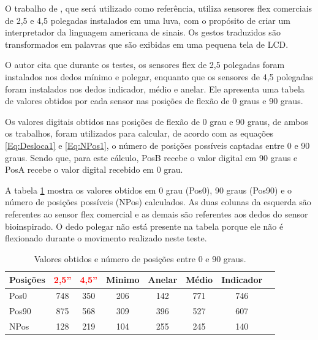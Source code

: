 \documentclass[
	12pt,				%
	openright,			%
	oneside,			%
	a4paper,			%
	english,			%
	brazil				%
	]{abntex2}
\begin{document}
	
		O trabalho de \cite{anbarasi2013deafmute}, que será utilizado como referência, utiliza sensores flex comerciais de 2,5 e 4,5 polegadas instalados em uma luva, com o propósito de criar um interpretador da linguagem americana de sinais. Os gestos traduzidos são transformados em palavras que são exibidas em uma pequena tela de LCD.

		O autor cita que durante os testes, os sensores flex de 2,5 polegadas foram instalados nos dedos mínimo e polegar, enquanto que os sensores de 4,5 polegadas foram instalados nos dedos indicador, médio e anelar. Ele apresenta uma tabela de valores obtidos por cada sensor nas posições de flexão de 0 graus e 90 graus.

		
		Os valores digitais obtidos nas posições de flexão de 0 grau e 90 graus, de ambos os trabalhos, foram utilizados para calcular, de acordo com as equações \ref{Eq:Desloca1} e \ref{Eq:NPos1}, o número de posições possíveis captadas entre 0 e 90 graus. Sendo que, para este cálculo, PosB recebe o valor digital em 90 graus e PosA recebe o valor digital recebido em 0 grau.

		A tabela \ref{Tab:NPos0-90} mostra os valores obtidos em 0 grau (Pos0), 90 graus (Pos90) e o número de posições possíveis (NPos) calculados. As duas colunas da esquerda são referentes ao sensor flex comercial e as demais são referentes aos dedos do sensor bioinspirado. O dedo polegar não está presente na tabela porque ele não é flexionado durante o movimento realizado neste teste.
		
		\begin{table}[H]
  	\centering
		\caption{Valores obtidos e número de posições entre 0 e 90 graus.}
    \begin{tabular}{l|ccccccc}
      \midrule
			Posições&\textcolor{red}{2,5''}	&\textcolor{red}{4,5''}	& Minimo	& Anelar	& Médio	&	Indicador	\\
      \midrule
			Pos0 		& 748 									& 350 									& 206 		&	142			&	771		&	746				\\
			Pos90 	& 875 									& 568 									& 309 		&	396			&	527		&	607				\\
			NPos 		& 128 									& 219 									& 104 		&	255			&	245		&	140				\\
      \midrule
    \end{tabular}
		\label{Tab:NPos0-90}
		\end{table}
\end{document}
